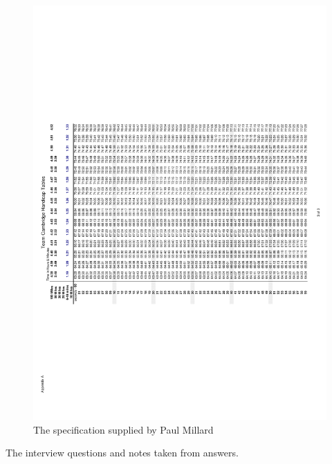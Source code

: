 \begin{figure}[H]
    \includegraphics[width=\textwidth]{./TeamCambridgeSpec/page9.pdf}
     \caption{The specification supplied by Paul Millard} \label{fig:Specification}
\end{figure}



The interview questions and notes taken from answers.

